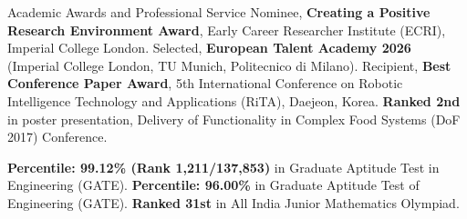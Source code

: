 

\begin{rubric}{Academic Awards and Professional Service}
\entry*[2026] Nominee, \textbf{Creating a Positive Research Environment Award}, Early Career Researcher Institute (ECRI), Imperial College London.
\entry*[2025] Selected, \textbf{European Talent Academy 2026} (Imperial College London, TU Munich, Politecnico di Milano).
\entry*[2017] Recipient, \textbf{Best Conference Paper Award}, 5th International Conference on Robotic Intelligence Technology and Applications (RiTA), Daejeon, Korea.
\entry*[2017] \textbf{Ranked 2nd} in poster presentation, Delivery of Functionality in Complex Food Systems (DoF 2017) Conference.


%
\entry*[2011] \textbf{Percentile: 99.12\% (Rank 1,211/137,853)} in Graduate Aptitude Test in Engineering (GATE).
\entry*[2010] \textbf{Percentile: 96.00\%} in Graduate Aptitude Test of Engineering (GATE).
\entry*[2004] \textbf{Ranked 31st} in All India Junior Mathematics Olympiad.
% 


\end{rubric}
